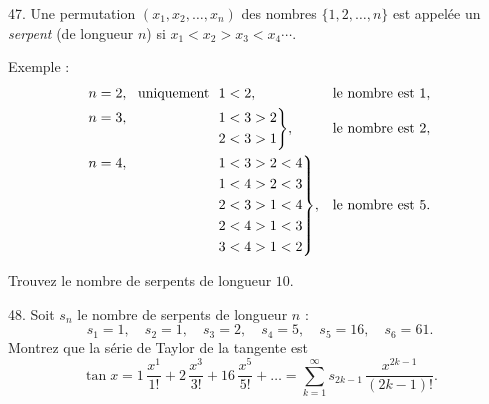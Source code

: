 \begin{problem}{47.}
    Une permutation \( (x_1, x_2, \dotsc, x_n) \) des nombres \( \{1, 2, \dotsc, n\} \) est appelée un
    \emph{serpent} (de longueur \( n \)) si \( x_1 < x_2 > x_3 < x_4 \dotsb \).

    \begin{note}{Exemple :}
        \begin{equation*}
            \begin{aligned}[t]
                &\begin{aligned}[t] n=2, \text{\ \ uniquement\ \ } 1<2, \end{aligned} &&\text{le nombre est }1, \\
                &\hskip-\nulldelimiterspace\mathord{\left.\begin{aligned} n=3, \hphantom{\text{\ \ uniquement\ \ }} 1&<3>2 \\
                2&<3>1\end{aligned} \right\}}, && \text{le nombre est }2, \\
                &\hskip-\nulldelimiterspace\mathord{\left.\begin{aligned} n=4, \hphantom{\text{\ \ uniquement\ \ }} 1&<3>2<4 \\
                1&<4>2<3 \\
                2&<3>1<4 \\
                2&<4>1<3 \\
                3&<4>1<2\end{aligned} \right\}},
                &&\text{le nombre est }5. \\
            \end{aligned}
        \end{equation*}
    \end{note}
    Trouvez le nombre de serpents de longueur \( 10 \).
\end{problem}

\begin{problem}{48.}
    Soit \( s_n \) le nombre de serpents de longueur \( n \) :
    \begin{equation*}
        s_1=1, \quad s_2=1, \quad s_3=2, \quad s_4=5, \quad s_5=16, \quad s_6=61.
    \end{equation*}
    Montrez que la série de Taylor de la tangente est
    \begin{equation*}
        \tan x=1\, \frac{x^1}{1!}+2\, \frac{x^3}{3!}+16\, \frac{x^5}{5!}+\dots=
        \textstyle\sum\limits_{k=1}^{\infty} s_{2k-1}\, \frac{x^{2k-1}}{(2k-1)!}.
    \end{equation*}
\end{problem}

